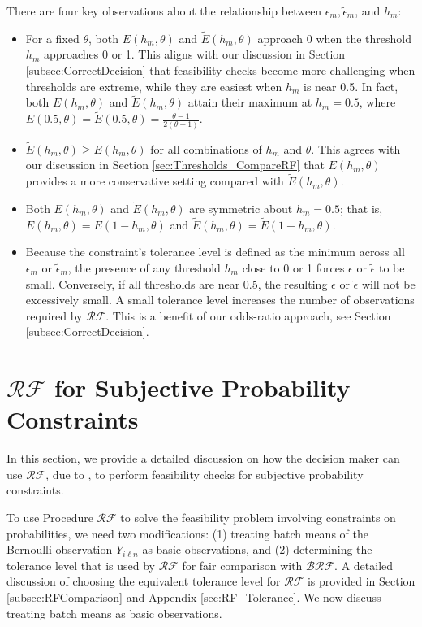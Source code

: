 \documentclass[11pt]{article}
\begin{document}
There are four key observations about the relationship between $\epsilon_m,\tilde{\epsilon}_m$, and $h_m$:
\begin{itemize}
    \item For a fixed $\theta$, both $E(h_m, \theta)$ and $\tilde{E}(h_m, \theta)$ approach 0 when the threshold $h_m$ approaches 0 or 1. This aligns with our discussion in Section \ref{subsec:CorrectDecision} that feasibility checks become more challenging when thresholds are extreme, while they are easiest when $h_m$ is near 0.5. In fact, both $E(h_m, \theta)$ and $\tilde{E}(h_m, \theta)$ attain their maximum at $h_m=0.5$, where $E(0.5, \theta)=\tilde{E}(0.5, \theta)=\frac{\theta-1}{2(\theta+1)}$.

    \item $\tilde{E}(h_m, \theta)\geq E(h_m, \theta)$ for all combinations of $h_m$ and $\theta$. This agrees with our discussion in Section \ref{sec:Thresholds_CompareRF} that $E(h_m, \theta)$ provides a more conservative setting compared with $\tilde{E}(h_m, \theta)$. 
    \item Both $E(h_m, \theta)$ and $\tilde{E}(h_m, \theta)$ are symmetric about $h_m = 0.5$; that is, $E(h_m, \theta)= E(1-h_m, \theta)$ and $\tilde{E}(h_m, \theta)= \tilde{E}(1-h_m, \theta)$. 
    \item Because the constraint’s tolerance level is defined as the minimum across all $\epsilon_m$ or $\tilde{\epsilon}_m$, the presence of any threshold $h_m$ close to 0 or 1 forces $\epsilon$ or $\tilde{\epsilon}$ to be small. Conversely, if all thresholds are near 0.5, the resulting $\epsilon$ or $\tilde{\epsilon}$ will not be excessively small. A small tolerance level increases the number of observations required by $\mathcal{RF}$. This is a benefit of our odds-ratio approach, see Section \ref{subsec:CorrectDecision}.
\end{itemize}

\section{$\mathcal{RF}$ for Subjective Probability Constraints}
\label{sec:RF}

In this section, we provide a detailed discussion on how the decision maker can use $\mathcal{RF}$, due to \citet{zhou2022finding}, to perform feasibility checks for subjective probability constraints.

To use Procedure $\mathcal{RF}$ to solve the feasibility problem involving constraints on probabilities, we need two modifications: (1) treating batch means of the Bernoulli observation $Y_{i\ell n}$ as basic observations, and (2) determining the tolerance level that is used by $\mathcal{RF}$ for fair comparison with $\mathcal{BRF}$. A detailed discussion of choosing the equivalent tolerance level for $\mathcal{RF}$ is provided in Section \ref{subsec:RFComparison} and Appendix \ref{sec:RF_Tolerance}. We now discuss treating batch means as basic observations. 
\end{document}
